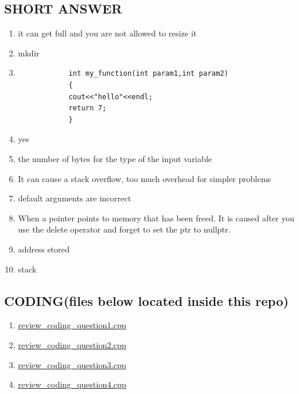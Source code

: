 \documentclass[a4paper]{article}
\begin{document}
\subsection{SHORT ANSWER}
\begin{enumerate}
    \item it can get full and you are not allowed to resize it
    \item mkdir
    \item \begin{verbatim}
            int my_function(int param1,int param2)
            {
            cout<<"hello"<<endl;
            return 7;
            }
            \end{verbatim}
    \item yes
    \item the number of bytes for the type of the input variable
    \item It can cause a stack overflow, too much overhead for simpler problems
    \item default arguments are incorrect
    \item When a pointer points to memory that has been freed. It is caused after
          you use the delete operator and forget to set the ptr to nullptr.
    \item address stored
    \item stack
\end{enumerate}

\subsection{CODING(files below located inside this repo)}
\begin{enumerate}
    \item \href{run:./review_coding_question1.cpp}{review\_coding\_question1.cpp}
    \item \href{run:./review_coding_question2.cpp}{review\_coding\_question2.cpp}
    \item \href{run:./review_coding_question3.cpp}{review\_coding\_question3.cpp}
    \item \href{run:./review_coding_question4.cpp}{review\_coding\_question4.cpp}
\end{enumerate}
\end{document}
